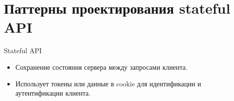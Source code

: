 \documentclass[
  ignorenonframetext,
  aspectratio=169,
  aspectratio=169]{beamer}
\providecommand{\tightlist}{%
  \setlength{\itemsep}{0pt}\setlength{\parskip}{0pt}}
\begin{document}
\hypertarget{ux43fux430ux442ux442ux435ux440ux43dux44b-ux43fux440ux43eux435ux43aux442ux438ux440ux43eux432ux430ux43dux438ux44f-stateful-api}{%
\section{Паттерны проектирования stateful
API}\label{ux43fux430ux442ux442ux435ux440ux43dux44b-ux43fux440ux43eux435ux43aux442ux438ux440ux43eux432ux430ux43dux438ux44f-stateful-api}}

\begin{frame}{Stateful API}
\protect\hypertarget{stateful-api}{}
\begin{itemize}
\tightlist
\item
  Сохранение состояния сервера между запросами клиента.
\item
  Использует токены или данные в cookie для идентификации и
  аутентификации клиента.
\end{itemize}
\end{frame}
\end{document}
